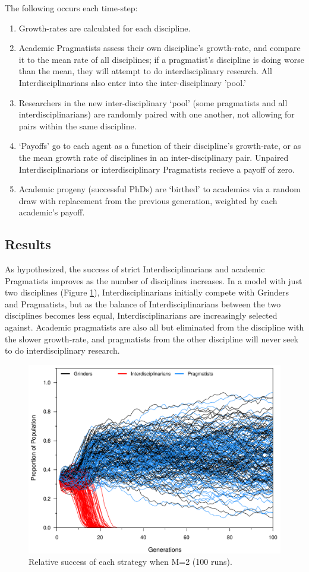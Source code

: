 \documentclass[letterpaper]{article} %
\begin{document}
The following occurs each time-step:
\begin{enumerate}
\item Growth-rates are calculated for each discipline.
\item Academic Pragmatists assess their own discipline’s growth-rate, and compare it to the mean rate of all disciplines; if a pragmatist's discipline is doing worse than the mean, they will attempt to do interdisciplinary research. All Interdisciplinarians also enter into the inter-disciplinary 'pool.'
\item Researchers in the new inter-disciplinary `pool' (some pragmatists and all interdisciplinarians) are randomly paired with one another, not allowing for pairs within the same discipline.
\item `Payoffs' go to each agent as a function of their discipline’s growth-rate, or as the mean growth rate of disciplines in an inter-disciplinary pair. Unpaired Interdisciplinarians or interdisciplinary Pragmatists recieve a payoff of zero.
\item Academic progeny (successful PhDs) are `birthed' to academics via a random draw with replacement from the previous generation, weighted by each academic's payoff.
\end{enumerate}

\subsection{Results}
As hypothesized, the success of strict Interdisciplinarians and academic Pragmatists improves as the number of disciplines increases. In a model with just two disciplines (Figure \ref{fig:1}), Interdisciplinarians initially compete with Grinders and Pragmatists, but as the balance of Interdisciplinarians between the two disciplines becomes less equal, Interdisciplinarians are increasingly selected against. Academic pragmatists are also all but eliminated from the discipline with the slower growth-rate, and pragmatists from the other discipline will never seek to do interdisciplinary research.

\begin{figure}[H]
\centering
\small
\includegraphics{Grinders-002}
\caption{Relative success of each strategy when M=2 (100 runs).}
\label{fig:1}
\end{figure}
\end{document}
